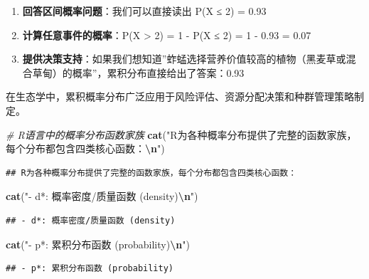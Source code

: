 \documentclass[
]{book}
\newenvironment{Shaded}{\begin{snugshade}}{\end{snugshade}}
\newcommand{\CommentTok}[1]{\textcolor[rgb]{0.56,0.35,0.01}{\textit{#1}}}
\newcommand{\FunctionTok}[1]{\textcolor[rgb]{0.13,0.29,0.53}{\textbf{#1}}}
\newcommand{\NormalTok}[1]{#1}
\newcommand{\SpecialCharTok}[1]{\textcolor[rgb]{0.81,0.36,0.00}{\textbf{#1}}}
\newcommand{\StringTok}[1]{\textcolor[rgb]{0.31,0.60,0.02}{#1}}
\providecommand{\tightlist}{%
  \setlength{\itemsep}{0pt}\setlength{\parskip}{0pt}}
\begin{document}
\begin{enumerate}
\def\labelenumi{\arabic{enumi}.}
\tightlist
\item
  \textbf{回答区间概率问题}：我们可以直接读出 P(X ≤ 2) = 0.93\\
\item
  \textbf{计算任意事件的概率}：P(X \textgreater{} 2) = 1 - P(X ≤ 2) = 1 - 0.93 = 0.07\\
\item
  \textbf{提供决策支持}：如果我们想知道''蚱蜢选择营养价值较高的植物（黑麦草或混合草甸）的概率''，累积分布直接给出了答案：0.93
\end{enumerate}

在生态学中，累积概率分布广泛应用于风险评估、资源分配决策和种群管理策略制定。

\begin{Shaded}
\begin{Highlighting}[]
\CommentTok{\# R语言中的概率分布函数家族}
\FunctionTok{cat}\NormalTok{(}\StringTok{"R为各种概率分布提供了完整的函数家族，每个分布都包含四类核心函数：}\SpecialCharTok{\textbackslash{}n}\StringTok{"}\NormalTok{)}
\end{Highlighting}
\end{Shaded}

\begin{verbatim}
## R为各种概率分布提供了完整的函数家族，每个分布都包含四类核心函数：
\end{verbatim}

\begin{Shaded}
\begin{Highlighting}[]
\FunctionTok{cat}\NormalTok{(}\StringTok{"{-} d*: 概率密度/质量函数 (density)}\SpecialCharTok{\textbackslash{}n}\StringTok{"}\NormalTok{)}
\end{Highlighting}
\end{Shaded}

\begin{verbatim}
## - d*: 概率密度/质量函数 (density)
\end{verbatim}

\begin{Shaded}
\begin{Highlighting}[]
\FunctionTok{cat}\NormalTok{(}\StringTok{"{-} p*: 累积分布函数 (probability)}\SpecialCharTok{\textbackslash{}n}\StringTok{"}\NormalTok{)}
\end{Highlighting}
\end{Shaded}

\begin{verbatim}
## - p*: 累积分布函数 (probability)
\end{verbatim}
\end{document}
